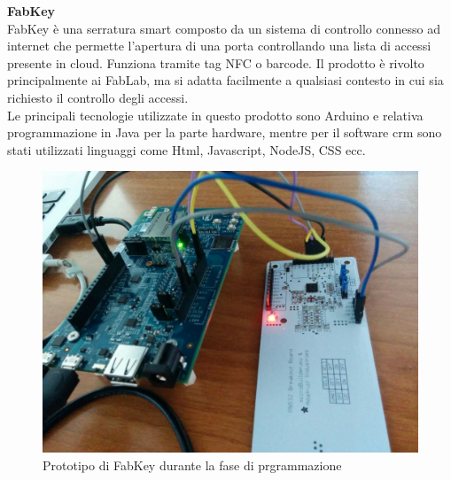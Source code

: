 \noindent \textbf{FabKey}
\\
FabKey è una serratura smart composto da un sistema di controllo connesso ad internet che permette l'apertura di una porta controllando una lista di accessi presente in cloud. Funziona tramite tag \gls{NFC} o barcode. Il prodotto è rivolto principalmente ai \gls{FabLab}, ma si adatta facilmente a qualsiasi contesto in cui sia richiesto il controllo degli accessi.\\
Le principali tecnologie utilizzate in questo prodotto sono Arduino e relativa programmazione in Java per la parte hardware, mentre per il software crm sono stati utilizzati linguaggi come Html, Javascript, NodeJS, CSS ecc.
\\
\begin{figure}[H]
	\begin{center}
	\includegraphics[scale=0.2]{immagini/fabkey.jpg}
	\caption{Prototipo di FabKey durante la fase di prgrammazione}
	\end{center}
\end{figure}

